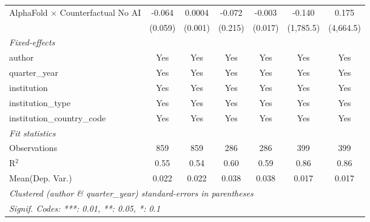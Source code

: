 \begin{tabular}{lcccccc}
   AlphaFold $\times$ Counterfactual No AI  & -0.064  & 0.0004  & -0.072  & -0.003  & -0.140    & 0.175\\   
                                            & (0.059) & (0.001) & (0.215) & (0.017) & (1,785.5) & (4,664.5)\\   
   \midrule
   \emph{Fixed-effects}\\
   author                                   & Yes     & Yes     & Yes     & Yes     & Yes       & Yes\\  
   quarter\_year                            & Yes     & Yes     & Yes     & Yes     & Yes       & Yes\\  
   institution                              & Yes     & Yes     & Yes     & Yes     & Yes       & Yes\\  
   institution\_type                        & Yes     & Yes     & Yes     & Yes     & Yes       & Yes\\  
   institution\_country\_code               & Yes     & Yes     & Yes     & Yes     & Yes       & Yes\\  
   \midrule
   \emph{Fit statistics}\\
   Observations                             & 859     & 859     & 286     & 286     & 399       & 399\\  
   R$^2$                                    & 0.55    & 0.54    & 0.60    & 0.59    & 0.86      & 0.86\\  
Mean(Dep. Var.) & 0.022 & 0.022 & 0.038 & 0.038 & 0.017 & 0.017 \\
   \midrule \midrule
   \multicolumn{7}{l}{\emph{Clustered (author \& quarter\_year) standard-errors in parentheses}}\\
   \multicolumn{7}{l}{\emph{Signif. Codes: ***: 0.01, **: 0.05, *: 0.1}}\\
\end{tabular}
\par\endgroup
